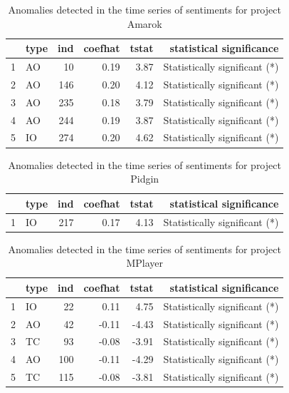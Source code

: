 \documentclass[12pt]{report}
\begin{document}
\begin{table}
\centering
\caption{Anomalies detected in the time series of sentiments for project Amarok}
\begin{tabular}{rlrrrr}
  \hline
 & type & ind & coefhat & tstat & statistical significance\\ 
  \hline
1 & AO &  10 & 0.19 & 3.87 & Statistically significant (*) \\ 
  2 & AO & 146 & 0.20 & 4.12  & Statistically significant (*)\\ 
  3 & AO & 235 & 0.18 & 3.79 & Statistically significant (*) \\ 
  4 & AO & 244 & 0.19 & 3.87  & Statistically significant (*)\\ 
  5 & IO & 274 & 0.20 & 4.62  & Statistically significant (*)\\ 
   \hline
\end{tabular}
\end{table}


\begin{table}
\centering
\caption{Anomalies detected in the time series of sentiments for project Pidgin}
\begin{tabular}{rlrrrr}
  \hline
 & type & ind & coefhat & tstat & statistical significance\\ 
  \hline
1 & IO & 217 & 0.17 & 4.13 & Statistically significant (*) \\ 
   \hline
\end{tabular}
\end{table}



\begin{table}
\centering
\caption{Anomalies detected in the time series of sentiments for project MPlayer}
\begin{tabular}{rlrrrr}
  \hline
 & type & ind & coefhat & tstat & statistical significance\\ 
  \hline
1 & IO &  22 & 0.11 & 4.75 & Statistically significant (*) \\ 
  2 & AO &  42 & -0.11 & -4.43 & Statistically significant (*) \\ 
  3 & TC &  93 & -0.08 & -3.91  & Statistically significant (*)\\ 
  4 & AO & 100 & -0.11 & -4.29 & Statistically significant (*) \\ 
  5 & TC & 115 & -0.08 & -3.81  & Statistically significant (*)\\ 
   \hline
\end{tabular}
\end{table}
\end{document}
